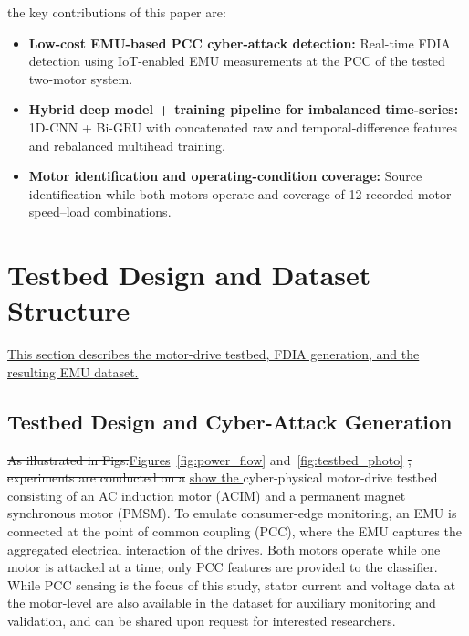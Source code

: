 \documentclass[conference,letterpaper]{IEEEtran}
\providecommand{\DIFadd}[1]{{\protect\color{blue}\uline{#1}}} %
\providecommand{\DIFdel}[1]{{\protect\color{red}\sout{#1}}}                      %
\providecommand{\DIFaddbegin}{} %
\providecommand{\DIFaddend}{} %
\providecommand{\DIFdelbegin}{} %
\providecommand{\DIFdelend}{} %
\begin{document}
the key contributions of this paper are:
\begin{itemize}
    \item \textbf{Low-cost EMU-based PCC cyber-attack detection:} Real-time FDIA detection using IoT-enabled EMU measurements at the PCC of the tested two-motor system.
    \item \textbf{Hybrid deep model + training pipeline for imbalanced time-series:} 1D-CNN + Bi-GRU with concatenated raw and temporal-difference features and rebalanced multihead training.
    \item \textbf{Motor identification and operating-condition coverage:} Source identification while both motors operate and coverage of 12 recorded motor--speed--load combinations.
\end{itemize}




\section{Testbed Design and Dataset Structure}
\DIFaddbegin \DIFadd{This section describes the motor-drive testbed, FDIA generation, and the resulting EMU dataset.
}\DIFaddend

\subsection{Testbed Design and Cyber-Attack Generation}

\DIFdelbegin \DIFdel{As illustrated in Figs.}\DIFdelend \DIFaddbegin \DIFadd{Figures}\DIFaddend ~\ref{fig:power_flow} and~\ref{fig:testbed_photo} \DIFdelbegin \DIFdel{, experiments are conducted on a }\DIFdelend \DIFaddbegin \DIFadd{show the }\DIFaddend cyber-physical motor-drive testbed consisting of an AC induction motor (ACIM)  and a permanent magnet synchronous motor (PMSM). To emulate consumer-edge monitoring, an EMU is connected at the point of common coupling (PCC), where the EMU captures the aggregated electrical interaction of the drives. Both motors operate while one motor is attacked at a time; only PCC features are provided to the classifier.
While PCC sensing is the focus of this study, stator current and voltage data at the motor-level are also available in the dataset for auxiliary monitoring and validation, and can be shared upon request for interested researchers.
\end{document}
